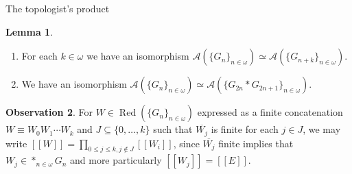 \documentclass{amsart}
\theoremstyle{definition}\newtheorem{theorem}{Theorem}
\theoremstyle{definition}\newtheorem*{A}{Main Theorem}
\theoremstyle{definition}\newtheorem*{B}{Theorem \ref{elementaryequiv}}
\theoremstyle{definition}\newtheorem*{C}{Theorem \ref{continuous}}
\theoremstyle{definition}\newtheorem*{D}{Theorem \ref{bigisomorphism2}}
\theoremstyle{definition}\newtheorem{bigtheorem}{Main Theorem}
\numberwithin{theorem}{section}
\theoremstyle{definition}\newtheorem{corollary}[theorem]{Corollary}
\theoremstyle{definition}\newtheorem{proposition}[theorem]{Proposition}
\theoremstyle{definition}\newtheorem{definition}[theorem]{Definition}
\theoremstyle{definition}\newtheorem{question}[theorem]{Question}
\theoremstyle{definition}\newtheorem{example}[theorem]{Example}
\theoremstyle{definition}\newtheorem{remark}[theorem]{Remark}
\theoremstyle{definition}\newtheorem{note}[theorem]{Note}
\theoremstyle{definition}\newtheorem{lemma}[theorem]{Lemma}
\theoremstyle{definition}\newtheorem{fact}[theorem]{Fact}
\theoremstyle{definition}\newtheorem{define}[theorem]{Definition}
\theoremstyle{definition}\newtheorem{claim}[theorem]{Claim}
\theoremstyle{definition}\newtheorem{obs}[theorem]{Observation}
\theoremstyle{definition}\newtheorem{definitions}[theorem]{Definitions}
\newcommand{\Red}{\operatorname{Red}}
\begin{document}
\begin{section}{The topologist's product}
\begin{lemma}
\begin{enumerate}
\item  For each $k \in \omega$ we have an isomorphism $\mathcal{A}(\{G_n\}_{n \in \omega}) \simeq \mathcal{A}(\{G_{n + k}\}_{n\in \omega})$.

\item We have an isomorphism $\mathcal{A}(\{G_n\}_{n \in \omega}) \simeq \mathcal{A}(\{G_{2n} * G_{2n + 1}\}_{n \in \omega})$.

\end{enumerate}

\end{lemma}



\begin{obs}\label{finitedeletions}  For $W \in \Red(\{G_n\}_{n \in \omega})$ expressed as a finite concatenation $W \equiv W_0W_1 \cdots W_k$ and $J \subseteq \{0, \ldots, k\}$ such that $\overline{W_j}$ is finite for each $j \in J$, we may write $[[W]] = \prod_{0 \leq j \leq k, j \notin J}[[W_i]]$, since $\overline{W_j}$ finite implies that $W_j \in *_{n \in \omega}G_n$ and more particularly $[[W_j]]=[[E]]$.
\end{obs}

\end{section}
\end{document}
